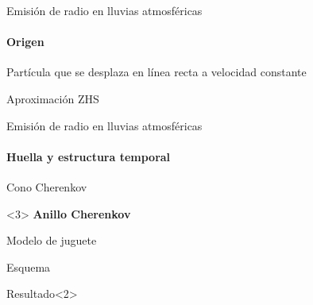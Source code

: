 \begin{frame}{Emisi\'on de radio en lluvias atmosf\'ericas}
\framesubtitle{Origen}
\footnotesize
	
	\begin{block}{Part\'icula que se desplaza en l\'inea recta a velocidad constante}
		\begin{center}
		\end{center}
	\end{block}
	
	\begin{block}{Aproximaci\'on ZHS}
		\begin{center}
		\end{center}
	\end{block}
\end{frame}

\begin{frame}{Emisi\'on de radio en lluvias atmosf\'ericas}
\framesubtitle{Huella y estructura temporal}
\footnotesize
	\begin{block}{Cono Cherenkov}
		\begin{overprint}
		\centerline{}
		\centerline{}
		\centerline{}
		\end{overprint}
	\end{block}
	\begin{alertblock}{}<3>
	\centering
	\alert<3>{\textbf{Anillo Cherenkov}}
	\end{alertblock}
\end{frame}

\begin{frame}{Modelo de juguete}
\footnotesize
	\begin{exampleblock}{Esquema}
		\begin{center}
		\end{center}
	\end{exampleblock}
	\begin{block}{Resultado}<2>
		\begin{center}
		\end{center}
	\end{block}
\end{frame}

